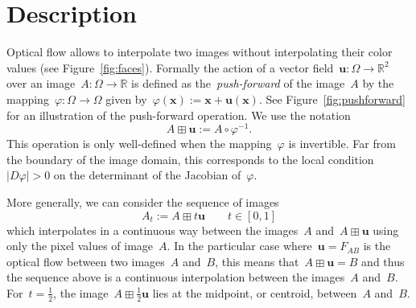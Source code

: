 \documentclass{ipol}
\def\R{\mathbb{R}}
\def\x{\mathbf{x}}
\def\u{\mathbf{u}}
\begin{document}
%
%
%
%
%


\section{Description}
Optical flow allows to interpolate two images without interpolating their
color values (see Figure~\ref{fig:faces}).  Formally the action of a vector
field~$\u:\Omega\to\R^2$ over an image~$A:\Omega\to\R$ is defined as
the~\emph{push-forward} of the image~$A$ by the
mapping~$\varphi:\Omega\to\Omega$ given by~$\varphi(\x):=\x+\u(\x)$.  See
Figure~\ref{fig:pushforward} for an illustration of the push-forward
operation.  We use the notation
\[
A\boxplus\u := A\circ\varphi^{-1}.
\]
This operation is only well-defined when the mapping~$\varphi$ is invertible.
Far from the boundary of the image domain,
this corresponds to the local
condition~$|D\varphi|>0$ on the determinant of the 
Jacobian of~$\varphi$. %
\par
More generally, we can consider the sequence of images
\[
A_t := A\boxplus t\u\qquad t\in[0,1]
\]
which interpolates in a continuous way between the images~$A$
and~$A\boxplus\u$ using only the pixel values of image~$A$.  In the particular
case where~$\u=F_{AB}$ is the optical flow between two images~$A$ and~$B$, this means
that~$A\boxplus\u=B$ and thus the sequence above is a continuous interpolation
between the images~$A$ and~$B$.  For~$t=\frac{1}{2}$, the
image~$A\boxplus\frac{1}{2}\u$ lies at the midpoint, or centroid, between~$A$
and~$B$.
\end{document}
